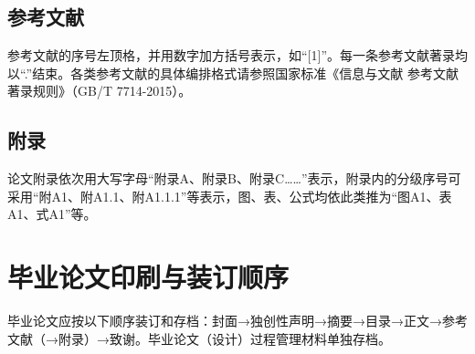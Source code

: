 \subsection{参考文献}

参考文献的序号左顶格，并用数字加方括号表示，如“[1]”。每一条参考文献著录均以“.”结束。各类参考文献的具体编排格式请参照国家标准《信息与文献 参考文献著录规则》（GB/T 7714-2015）。

\subsection{附录}

论文附录依次用大写字母“附录A、附录B、附录C……”表示，附录内的分级序号可采用“附A1、附A1.1、附A1.1.1”等表示，图、表、公式均依此类推为“图A1、表A1、式A1”等。

\section{毕业论文印刷与装订顺序}

毕业论文应按以下顺序装订和存档：封面→独创性声明→摘要→目录→正文→参考文献（→附录）→致谢。毕业论文（设计）过程管理材料单独存档。
